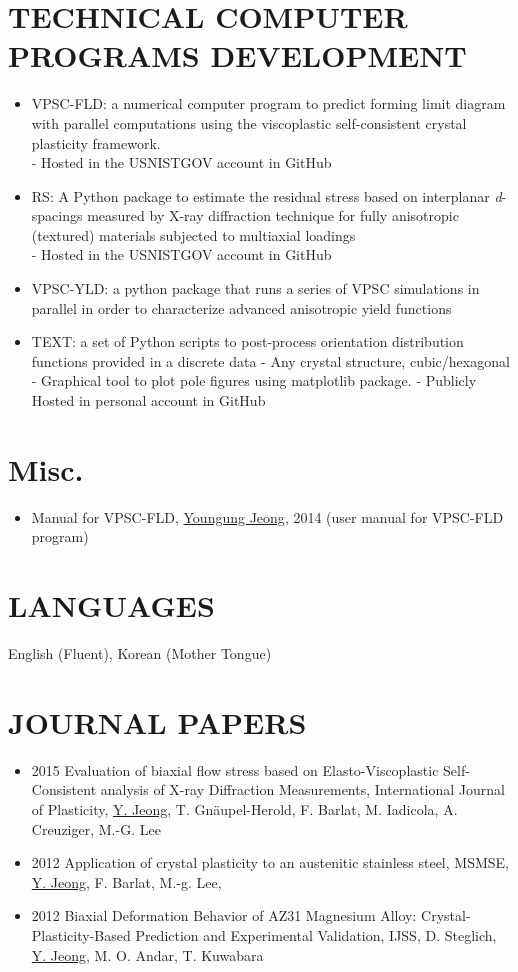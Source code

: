 \documentclass{res}
\begin{document}
\begin{resume}
  \section{TECHNICAL COMPUTER PROGRAMS DEVELOPMENT}
  \begin{itemize}
  \item VPSC-FLD: a numerical computer program to predict forming limit diagram with parallel computations using the viscoplastic self-consistent crystal plasticity framework.\\
    - Hosted in the USNISTGOV account in GitHub
  \item RS: A Python package to estimate the residual stress based on interplanar \emph{d}-spacings measured by X-ray diffraction technique for fully anisotropic (textured) materials subjected to multiaxial loadings\\
    - Hosted in the USNISTGOV account in GitHub
  \item VPSC-YLD: a python package that runs a series of VPSC simulations in parallel in order to characterize advanced anisotropic yield functions
  \item TEXT: a set of Python scripts to post-process orientation distribution functions provided in a discrete data
    - Any crystal structure, cubic/hexagonal
    - Graphical tool to plot pole figures using matplotlib package.
    - Publicly Hosted in personal account in GitHub
  \end{itemize}

  \section{Misc.}
  \begin{itemize}
  \item Manual for VPSC-FLD, \underline{Youngung Jeong}, 2014 (user manual for VPSC-FLD program)
  \end{itemize}

  \section{LANGUAGES}
  English (Fluent), Korean (Mother Tongue)

  \section{JOURNAL PAPERS}
  \begin{itemize}
  \item 2015 Evaluation of biaxial flow stress based on Elasto-Viscoplastic Self-Consistent analysis of X-ray Diffraction Measurements, International Journal of Plasticity, \underline{Y. Jeong}, T. Gn\"{a}upel-Herold, F. Barlat, M. Iadicola, A. Creuziger, M.-G. Lee
  \item 2012 Application of crystal plasticity to an austenitic stainless steel, MSMSE, \underline{Y. Jeong}, F. Barlat, M.-g. Lee,
  \item 2012 Biaxial Deformation Behavior of AZ31 Magnesium Alloy: Crystal-Plasticity-Based Prediction and Experimental Validation, IJSS, D. Steglich, \underline{Y. Jeong}, M. O. Andar, T. Kuwabara
  \end{itemize}


\end{resume}
\end{document}
